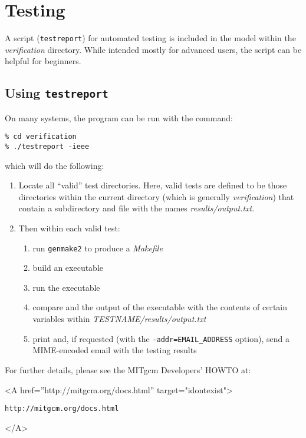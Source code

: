 
\section{Testing}
\label{sect:testing}
\label{www:testing}

A script (\texttt{testreport}) for automated testing is included in
the model within the {\em verification} directory.  While intended
mostly for advanced users, the script can be helpful for beginners.

\subsection{Using \texttt{testreport}}

On many systems, the program can be run with the command:
\begin{verbatim}
% cd verification
% ./testreport -ieee
\end{verbatim}
which will do the following:
\begin{enumerate}
\item Locate all ``valid'' test directories.  Here, valid tests are
  defined to be those directories within the current directory (which
  is generally {\em verification}) that contain a subdirectory and
  file with the names {\em results/output.txt}.

\item Then within each valid test:
  \begin{enumerate}
  \item run \texttt{genmake2} to produce a {\em Makefile}
  \item build an executable
  \item run the executable
  \item compare and the output of the executable with the
    contents of certain variables within {\em
      TESTNAME/results/output.txt}
  \item print and, if requested (with the
    \texttt{-addr=EMAIL\_ADDRESS} option), send a MIME-encoded email
    with the testing results
  \end{enumerate}

\end{enumerate}

For further details, please see the MITgcm Developers' HOWTO at:
\begin{rawhtml} <A href=''http://mitgcm.org/docs.html'' target="idontexist"> \end{rawhtml}
\begin{verbatim}
http://mitgcm.org/docs.html
\end{verbatim}
\begin{rawhtml} </A> \end{rawhtml}


